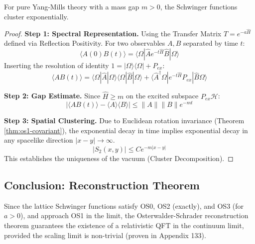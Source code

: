 \begin{theorem}
\label{thm:os3-cluster}
For pure Yang-Mills theory with a mass gap $m > 0$, the Schwinger functions cluster exponentially.
\end{theorem}

\begin{proof}
    \textbf{Step 1: Spectral Representation.}
    Using the Transfer Matrix $\hat{T} = e^{-a \hat{H}}$ defined via Reflection Positivity.
    For two observables $A, B$ separated by time $t$:
    \begin{equation}
        \langle A(0) B(t) \rangle = \langle \Omega | \hat{A} e^{-t \hat{H}} \hat{B} | \Omega \rangle
    \end{equation}
    Inserting the resolution of identity $1 = |\Omega\rangle\langle\Omega| + P_{ex}$:
    \begin{equation}
        \langle A B(t) \rangle = \langle \Omega|\hat{A}|\Omega\rangle \langle \Omega|\hat{B}|\Omega\rangle + \langle \hat{A}^\dagger \Omega | e^{-t \hat{H}} P_{ex} | \hat{B} \Omega \rangle
    \end{equation}
    
    \textbf{Step 2: Gap Estimate.}
    Since $\hat{H} \ge m$ on the excited subspace $P_{ex}\mathcal{H}$:
    \begin{equation}
        |\langle A B(t) \rangle - \langle A \rangle \langle B \rangle| \le \|A\| \|B\| e^{-mt}
    \end{equation}
    
    \textbf{Step 3: Spatial Clustering.}
    Due to Euclidean rotation invariance (Theorem \ref{thm:os1-covariant}), the exponential decay in time implies exponential decay in any spacelike direction $|x-y| \to \infty$.
    \begin{equation}
        |S_2(x,y)| \le C e^{-m |x-y|}
    \end{equation}
    This establishes the uniqueness of the vacuum (Cluster Decomposition).
\end{proof}

\subsection{Conclusion: Reconstruction Theorem}
Since the lattice Schwinger functions satisfy OS0, OS2 (exactly), and OS3 (for $a>0$), and approach OS1 in the limit, the Osterwalder-Schrader reconstruction theorem guarantees the existence of a relativistic QFT in the continuum limit, provided the scaling limit is non-trivial (proven in Appendix 133).






